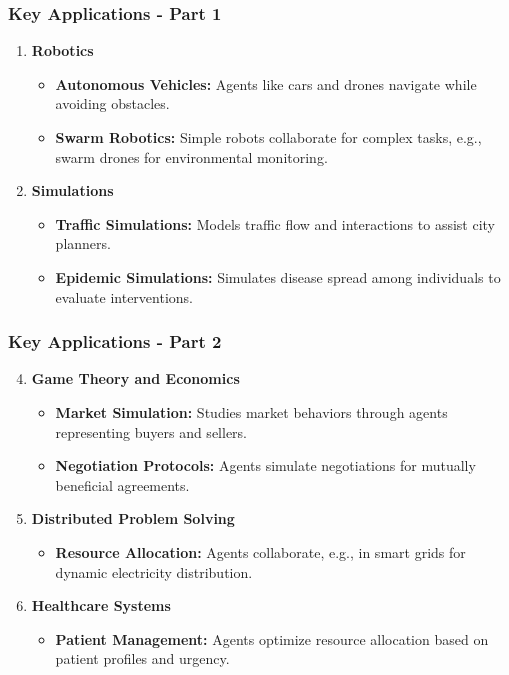 \documentclass[aspectratio=169]{beamer}
\begin{document}
\begin{frame}[fragile]
    \frametitle{Key Applications - Part 1}
    \begin{enumerate}
        \item \textbf{Robotics}
            \begin{itemize}
                \item \textbf{Autonomous Vehicles:} Agents like cars and drones navigate while avoiding obstacles.
                \item \textbf{Swarm Robotics:} Simple robots collaborate for complex tasks, e.g., swarm drones for environmental monitoring.
            \end{itemize}
        
        \item \textbf{Simulations}
            \begin{itemize}
                \item \textbf{Traffic Simulations:} Models traffic flow and interactions to assist city planners.
                \item \textbf{Epidemic Simulations:} Simulates disease spread among individuals to evaluate interventions.
            \end{itemize}
    \end{enumerate}
\end{frame}

\begin{frame}[fragile]
    \frametitle{Key Applications - Part 2}
    \begin{enumerate}
        \setcounter{enumi}{3}
        \item \textbf{Game Theory and Economics}
            \begin{itemize}
                \item \textbf{Market Simulation:} Studies market behaviors through agents representing buyers and sellers.
                \item \textbf{Negotiation Protocols:} Agents simulate negotiations for mutually beneficial agreements.
            \end{itemize}

        \item \textbf{Distributed Problem Solving}
            \begin{itemize}
                \item \textbf{Resource Allocation:} Agents collaborate, e.g., in smart grids for dynamic electricity distribution.
            \end{itemize}

        \item \textbf{Healthcare Systems}
            \begin{itemize}
                \item \textbf{Patient Management:} Agents optimize resource allocation based on patient profiles and urgency.
            \end{itemize}
    \end{enumerate}
\end{frame}
\end{document}
